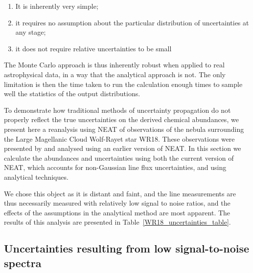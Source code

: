\documentclass[useAMS,usenatbib]{mn2e}
\begin{document}
\begin{enumerate}
  \item It is inherently very simple;
  \item it requires no assumption about the particular distribution of uncertainties at any stage;
  \item it does not require relative uncertainties to be small
\end{enumerate}

The Monte Carlo approach is thus inherently robust when applied to real astrophysical data, in a way that the analytical approach is not.  The only limitation is then the time taken to run the calculation enough times to sample well the statistics of the output distributions.

To demonstrate how traditional methods of uncertainty propagation do not properly reflect the true uncertainties on the derived chemical abundances, we present here a reanalysis using NEAT of observations of the nebula surrounding the Large Magellanic Cloud Wolf-Rayet star WR18.  These observations were presented by \citet{2011MNRAS.tmp.1754S} and analysed using an earlier version of NEAT.  In this section we calculate the abundances and uncertainties using both the current version of NEAT, which accounts for non-Gaussian line flux uncertainties, and using analytical techniques.

We chose this object as it is distant and faint, and the line measurements are thus necessarily measured with relatively low signal to noise ratios, and the effects of the assumptions in the analytical method are most apparent.  The results of this analysis are presented in Table~\ref{WR18_uncertainties_table}.



\subsection{Uncertainties resulting from low signal-to-noise spectra}
\end{document}

